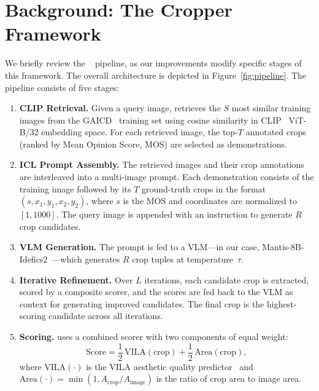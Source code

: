 \section{Background: The Cropper Framework}
\label{sec:background}

We briefly review the \baseline~\cite{cropper2025} pipeline, as our
improvements modify specific stages of this framework.  The overall
architecture is depicted in Figure~\ref{fig:pipeline}.  The pipeline
consists of five stages:

\begin{enumerate}[leftmargin=*, labelsep=0.5em, itemsep=4pt]
\item[\textbf{Step 1.}] \textbf{CLIP Retrieval.}
Given a query image, \baseline retrieves the $S$ most similar training
images from the GAICD~\cite{gaicd2020} training set using cosine
similarity in CLIP~\cite{clip2021} ViT-B/32 embedding space.  For each
retrieved image, the top-$T$ annotated crops (ranked by Mean Opinion
Score, MOS) are selected as demonstrations.

\item[\textbf{Step 2.}] \textbf{ICL Prompt Assembly.}
The retrieved images and their crop annotations are interleaved into a
multi-image prompt.  Each demonstration consists of the training image
followed by its $T$ ground-truth crops in the format
$(s, x_1, y_1, x_2, y_2)$, where $s$ is the MOS and coordinates are
normalized to $[1, 1000]$.  The query image is appended with an
instruction to generate $R$ crop candidates.

\item[\textbf{Step 3.}] \textbf{VLM Generation.}
The prompt is fed to a VLM---in our case,
Mantis-8B-Idefics2~\cite{mantis2024}---which generates $R$ crop tuples
at temperature~$\tau$.

\item[\textbf{Step 4.}] \textbf{Iterative Refinement.}
Over $L$ iterations, each candidate crop is extracted, scored by a
composite scorer, and the scores are fed back to the VLM as context for
generating improved candidates.  The final crop is the highest-scoring
candidate across all iterations.

\item[\textbf{Step 5.}] \textbf{Scoring.}
\baseline uses a combined scorer with two components of equal weight:
\begin{equation}
    \text{Score} = \frac{1}{2}\,\text{VILA}(\text{crop}) + \frac{1}{2}\,\text{Area}(\text{crop}),
    \label{eq:scorer}
\end{equation}
where $\text{VILA}(\cdot)$ is the VILA aesthetic quality
predictor~\cite{vila2024} and $\text{Area}(\cdot) = \min(1, A_{\text{crop}} / A_{\text{image}})$
is the ratio of crop area to image area.
\end{enumerate}

